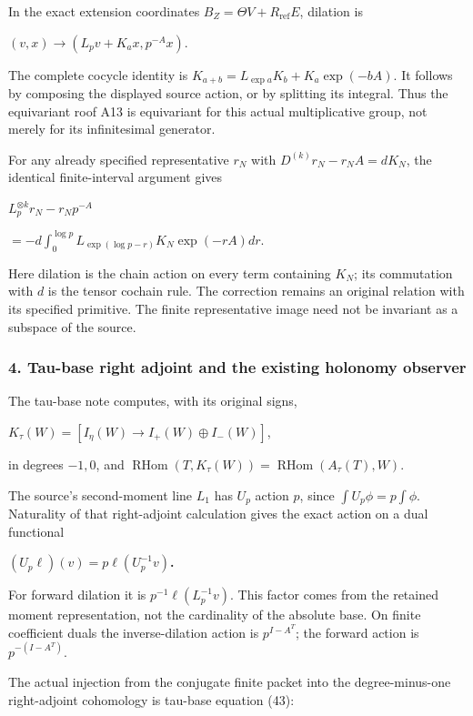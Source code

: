 In the exact extension coordinates \(B_Z=\Theta V+R_{\mathrm{ref}} E\), dilation is

\((v,x)\to (L_p v+K_a x,p^{-A}x)\).

The complete cocycle identity is \(K_{a+b}=L_{\exp a}K_b+K_a \exp(-bA)\). It follows by composing the displayed source action, or by splitting its integral. Thus the equivariant roof A13 is equivariant for this actual multiplicative group, not merely for its infinitesimal generator.

For any already specified representative \(r_N\) with \(D^{(k)}r_N-r_NA=dK_N\), the identical finite-interval argument gives

\(L_p^{\otimes k}r_N-r_Np^{-A}\)

\(=-d \int_0^{\log p} L_{\exp(\log p-r)} K_N \exp(-rA)dr\).

Here dilation is the chain action on every term containing \(K_N\); its commutation with \(d\) is the tensor cochain rule. The correction remains an original relation with its specified primitive. The finite representative image need not be invariant as a subspace of the source.

\subsubsection{4. Tau-base right adjoint and the existing holonomy observer}\label{endpoint-f1_scaling--tau-base-right-adjoint-and-the-existing-holonomy-observer}

The tau-base note computes, with its original signs,

\(K_\tau(W)=[I_\eta(W) \to  I_+(W) \oplus I_-(W)]\),

in degrees \(-1,0\), and \(\operatorname{RHom}(T,K_\tau(W))=\operatorname{RHom}(A_\tau(T),W)\).

The source's second-moment line \(L_1\) has \(U_p\) action \(p\), since \(\int U_p \phi=p \int \phi\). Naturality of that right-adjoint calculation gives the exact action on a dual functional

\textbf{\((U_p \ell)(v)=p \ell(U_p^{-1}v)\).}

For forward dilation it is \(p^{-1}\ell(L_p^{-1}v)\). This factor comes from the retained moment representation, not the cardinality of the absolute base. On finite coefficient duals the inverse-dilation action is \(p^{I-A^T}\); the forward action is \(p^{-(I-A^T)}\).

The actual injection from the conjugate finite packet into the degree-minus-one right-adjoint cohomology is tau-base equation (43):

